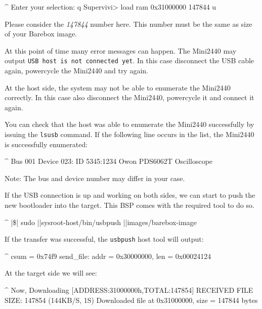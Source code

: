 \begin{ptxshell}[escapechar=|]{^}
Enter your selection: q
Supervivi> load ram 0x31000000 147844 u
\end{ptxshell}

Please consider the \textit{147844} number here. This number must be the same
as size of your Barebox image.

At this point of time many error messages can happen. The Mini2440
may output \texttt{USB host is not connected yet}. In this case disconnect
the USB cable again, powercycle the Mini2440 and try again.

At the host side, the system may not be able to enumerate the Mini2440
correctly. In this case also disconnect the Mini2440, powercycle it
and connect it again.

You can check that the host was able to enumerate the Mini2440 successfully by
issuing the \texttt{lsusb} command. If the following line occurs in the list,
the Mini2440 is successfully enumerated:

\begin{ptxshell}[escapechar=|]{^}
Bus 001 Device 023: ID 5345:1234 Owon PDS6062T Oscilloscope
\end{ptxshell}

Note: The bus and device number may differ in your case.

If the USB connection is up and working on both sides, we can start to push
the new bootloader into the target. This BSP comes with the required tool to do
so.

\begin{ptxshell}[escapechar=|]{^}
|\$| sudo |\ptxdistPlatformDir |sysroot-host/bin/usbpush |\ptxdistPlatformDir |images/barebox-image
\end{ptxshell}

If the transfer was successful, the \texttt{usbpush} host tool will output:

\begin{ptxshell}[escapechar=|]{^}
csum = 0x74f9
send_file: addr = 0x30000000, len = 0x00024124
\end{ptxshell}

At the target side we will see:

\begin{ptxshell}[escapechar=|]{^}
Now, Downloading [ADDRESS:31000000h,TOTAL:147854]
RECEIVED FILE SIZE:  147854 (144KB/S, 1S)
Downloaded file at 0x31000000, size = 147844 bytes
\end{ptxshell}

